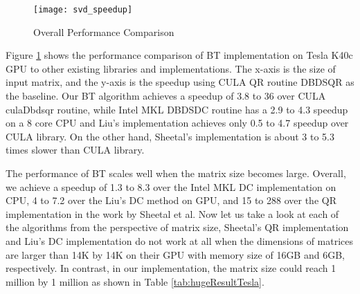 \begin{figure}[t]
\vspace{-0.1in}
\centering
\texttt{[image: svd\_speedup]}
\vspace{-0.1in}
\caption{Overall Performance Comparison}
\label{fig:svd_speedup}
\vspace{-0.2in}
\end{figure}
Figure \ref{fig:svd_speedup} shows the performance comparison of BT
implementation on Tesla K40c GPU to other existing libraries
and implementations.
The x-axis is the size of input matrix, and the y-axis is the speedup
using CULA QR routine DBDSQR as the baseline.
Our BT algorithm achieves a speedup of 3.8 to 36 over CULA culaDbdsqr routine,
while Intel MKL DBDSDC routine has a 2.9 to 4.3 speedup on a 8 core CPU and Liu's implementation achieves only 0.5 to 4.7 speedup over CULA library.
On the other hand, Sheetal's implementation is about 3 to 5.3 times slower than CULA library.

The performance of BT scales well when the matrix size becomes large.
Overall, we achieve a speedup of 1.3 to 8.3 over the Intel MKL
DC implementation on CPU, 4 to 7.2 over the Liu's
DC method on GPU, and 15 to 288 over the QR implementation in the work by Sheetal et al.
Now let us take a look at each of the algorithms from the perspective of matrix size, Sheetal's QR implementation and Liu's DC implementation do not work at all when the dimensions of matrices are larger than 14K by 14K on their GPU with memory size of 16GB and 6GB, respectively. In contrast, in our implementation, the matrix size could reach 1 million by 1 million as shown in Table \ref{tab:hugeResultTesla}.

